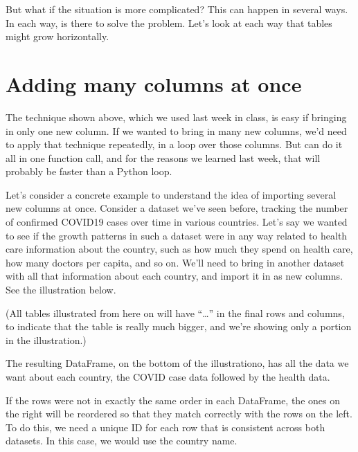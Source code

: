 \documentclass[letterpaper,10pt,english]{sphinxmanual}
\begin{document}
But what if the situation is more complicated?  This can happen in several ways.  In each way,  is there to solve the problem.  Let’s look at each way that tables might grow horizontally.


\section{Adding many columns at once}
\label{\detokenize{chapter-12-concat-and-merge:adding-many-columns-at-once}}
The technique shown above, which we used last week in class, is easy if bringing in only one new column.  If we wanted to bring in many new columns, we’d need to apply that technique repeatedly, in a loop over those columns.  But  can do it all in one function call, and for the reasons we learned last week, that will probably be faster than a Python loop.

Let’s consider a concrete example to understand the idea of importing several new columns at once.  Consider a dataset we’ve seen before, tracking the number of confirmed COVID\sphinxhyphen{}19 cases over time in various countries.  Let’s say we wanted to see if the growth patterns in such a dataset were in any way related to health care information about the country, such as how much they spend on health care, how many doctors per capita, and so on.  We’ll need to bring in another dataset with all that information about each country, and import it in as new columns.  See the illustration below.

(All tables illustrated from here on will have “…” in the final rows and columns, to indicate that the table is really much bigger, and we’re showing only a portion in the illustration.)


The resulting DataFrame, on the bottom of the illustrationo, has all the data we want about each country, the COVID case data followed by the health data.

If the rows were not in exactly the same order in each DataFrame, the ones on the right will be reordered so that they match correctly with the rows on the left.  To do this, we need a unique ID for each row that is consistent across both datasets.  In this case, we would use the country name.
\end{document}

